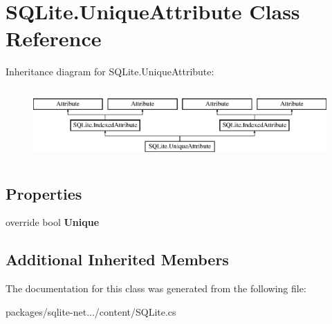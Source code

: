 \hypertarget{classSQLite_1_1UniqueAttribute}{\section{S\-Q\-Lite.\-Unique\-Attribute Class Reference}
\label{classSQLite_1_1UniqueAttribute}
}
Inheritance diagram for S\-Q\-Lite.\-Unique\-Attribute\-:\begin{figure}[H]
\begin{center}
\leavevmode
\includegraphics[height=2.745098cm]{classSQLite_1_1UniqueAttribute}
\end{center}
\end{figure}
\subsection*{Properties}
\begin{DoxyCompactItemize}
\item 
\hypertarget{classSQLite_1_1UniqueAttribute_a633edad2f482d6b398f902bf3a1d8615}{override bool {\bfseries Unique}}\label{classSQLite_1_1UniqueAttribute_a633edad2f482d6b398f902bf3a1d8615}

\end{DoxyCompactItemize}
\subsection*{Additional Inherited Members}


The documentation for this class was generated from the following file\-:\begin{DoxyCompactItemize}
\item 
packages/sqlite-\/net.../content/S\-Q\-Lite.\-cs\end{DoxyCompactItemize}
